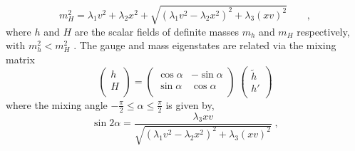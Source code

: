 \begin{equation}
 m_H^2=  \lambda_1 v^2 + \lambda_2 x^2 +\sqrt{(\lambda_1 v^2 - \lambda_2 x^2)^2 +\lambda_3 (xv)^2 } \qquad,  \end{equation}
\newline
where $h$ and $H$ are the scalar fields of definite masses $m_h$ and $m_H$ respectively, with $m_h^2 < m_H^2$ .
The gauge and mass eigenstates are related via the mixing matrix
\newline
$$
\left(
\begin{array}{c}
h   \\
H \\
\end{array}
\right)
=
\left(
\begin{array}{cc}
\cos \alpha & -\sin \alpha   \\
\sin \alpha & \cos \alpha \\
\end{array}
\right)
\;
\left(
\begin{array}{c}
\tilde{h}   \\
h' \\
\end{array}
\right)
$$
\newline
where the mixing angle $ - \frac{\pi}{2} \leq \alpha \leq  \frac{\pi}{2} $ is given by,
\newline
\begin{equation}
\sin 2 \alpha= \frac{\lambda_3 xv}{\sqrt{(\lambda_1 v^2 - \lambda_2 x^2)^2 +\lambda_3 (xv)^2 } } \; , \end{equation}


